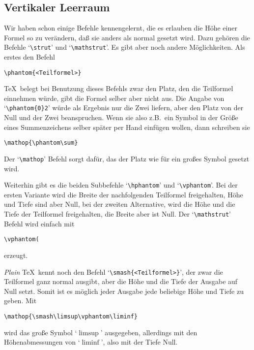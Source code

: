 \subsection{Vertikaler Leerraum}
Wir haben schon einige Befehle kennengelernt, die es erlauben die
H\"ohe
einer Formel so zu ver\"andern, da\ss{} sie anders als normal gesetzt wird.
Dazu geh\"oren die Befehle
`\verb|\strut|' und 
`\verb|\mathstrut|'. Es
gibt aber noch andere M\"oglichkeiten. Als erstes den Befehl
\begin{verbatim}
\phantom{<Teilformel>}
\end{verbatim}
\TeX\ belegt bei Benutzung dieses Befehls zwar den Platz, den die
Teilformel einnehmen w\"urde, gibt die Formel selber aber nicht aus. Die
Angabe von `\verb|\phantom{0}2|' w\"urde als Ergebnis nur die Zwei
liefern, aber den Platz von der Null und der Zwei beanspruchen. Wenn
sie also z.B.\ ein Symbol in der
Gr\"o\ss{}e eines Summenzeichens selber
sp\"ater per Hand einf\"ugen wollen, dann schreiben sie
\begin{verbatim}
\mathop{\phantom\sum}
\end{verbatim}
Der `\verb|\mathop|' Befehl sorgt daf\"ur, das der Platz wie f\"ur ein
gro\ss{}es Symbol gesetzt wird.

Weiterhin gibt es die beiden 
Subbefehle `\verb|\hphantom|' und
`\verb|\vphantom|'. Bei der ersten Variante wird die Breite der
nachfolgenden Teilformel freigehalten, 
H\"ohe und Tiefe sind aber Null,
bei der zweiten Alternative, wird die H\"ohe und die Tiefe der
Teilformel freigehalten, die Breite aber ist Null. Der
`\verb|\mathstrut|' Befehl wird einfach mit
\begin{verbatim}
\vphantom(
\end{verbatim}
erzeugt.

{\em Plain} \TeX\ kennt noch den Befehl
`\verb|\smash{<Teilformel>}|', der
zwar die Teilformel ganz normal ausgibt, aber die H\"ohe und die Tiefe
der 
Ausgabe auf Null setzt. Somit ist es m\"oglich jeder Ausgabe jede
beliebige H\"ohe und Tiefe zu geben. Mit
\begin{verbatim}
\mathop{\smash\limsup\vphantom\liminf}
\end{verbatim}
wird das gro\ss{}e Symbol `$\limsup$' ausgegeben, allerdings mit den
H\"ohenabmessungen von `$\liminf$', also mit der Tiefe Null.

